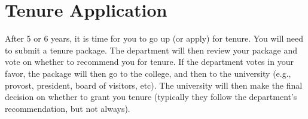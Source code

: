 \documentclass[oneside,11pt,dvipsnames]{book}
\begin{document}


\chapter{Tenure Application}

After 5 or 6 years, it is time for you to go up (or apply) for tenure.  You will need to submit a tenure package.  The department will then review your package and vote on whether to recommend you for tenure.  If the department votes in your favor, the package will then go to the college, and then to the university (e.g., provost, president, board of visitors, etc).  The university will then make the final decision on whether to grant you tenure (typically they follow the department's recommendation, but not always).



\end{document}
